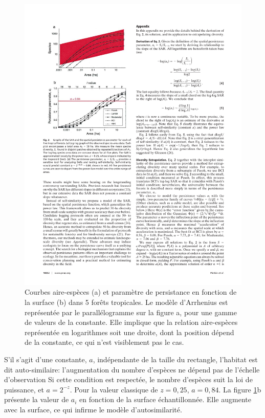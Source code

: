 \documentclass[
  11pt,
  french,
  a4paper,
  extrafontsizes,onecolumn,openright
  ]{memoir}
\begin{document}
\begin{figure}

{\centering \includegraphics[width=0.8\linewidth]{images/Plotkin2000} 

}

\caption{Courbes aire-espèces (a) et paramètre de persistance en fonction de la surface (b) dans 5 forêts tropicales. Le modèle d'Arrhenius est représentée par le parallélogramme sur la figure a, pour une gamme de valeurs de la constante. Elle implique que la relation aire-espèces représentée en logarithmes soit une droite, dont la position dépend de la constante, ce qui n'est visiblement pas le cas.}\label{fig:Plotkin2000}
\end{figure}

\normalsize

S'il s'agit d'une constante, \(a\), indépendante de la taille du rectangle, l'habitat est dit auto-similaire: l'augmentation du nombre d'espèces ne dépend pas de l'échelle d'observation Si cette condition est respectée, le nombre d'espèces suit la loi de puissance, et \(a=2^{-z}\).
Pour la valeur classique de \(z=0,25\), \(a=0,84\).
La figure \ref{fig:Plotkin2000}b \autocite{Plotkin2000} présente la valeur de \(a_i\) en fonction de la surface échantillonnée.
Elle augmente avec la surface, ce qui infirme le modèle d'autosimilarité.
\end{document}
